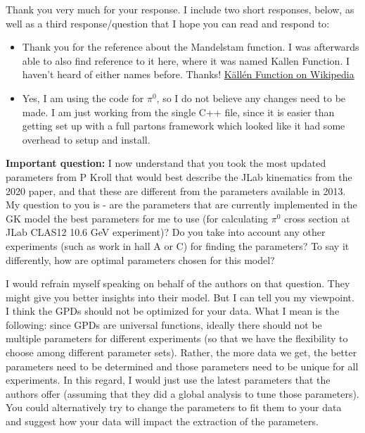     
    
    Thank you very much for your response. I include two short responses, below, as well as a third response/question that I hope you can read and respond to: 
    
    \begin{itemize}
        \item Thank you for the reference about the Mandelstam function. I was afterwards able to also find reference to it here, where it was named Kallen Function. I haven't heard of either names before. Thanks! \href{https://en.wikipedia.org/wiki/K%C3%A4ll%C3%A9n_function}{Källén Function on Wikipedia}
    
        \item Yes, I am using the code for $\pi^0$, so I do not believe any changes need to be made. I am just working from the single C++ file, since it is easier than getting set up with a full partons framework which looked like it had some overhead to setup and install.
    \end{itemize}
    
    \textbf{Important question:} I now understand that you took the most updated parameters from P Kroll that would best describe the JLab kinematics from the 2020 paper, and that these are different from the parameters available in 2013. My question to you is - are the parameters that are currently implemented in the GK model the best parameters for me to use (for calculating $\pi^0$ cross section at JLab CLAS12 10.6 GeV experiment)? Do you take into account any other experiments (such as work in hall A or C) for finding the parameters? To say it differently, how are optimal parameters chosen for this model?
    
    I would refrain myself speaking on behalf of the authors on that question. They might give you better insights into their model. But I can tell you my viewpoint. I think the GPDs should not be optimized for your data. What I mean is the following: since GPDs are universal functions, ideally there should not be multiple parameters for different experiments (so that we have the flexibility to choose among different parameter sets). Rather, the more data we get, the better parameters need to be determined and those parameters need to be unique for all experiments. In this regard, I would just use the latest parameters that the authors offer (assuming that they did a global analysis to tune those parameters). You could alternatively try to change the parameters to fit them to your data and suggest how your data will impact the extraction of the parameters.
    
